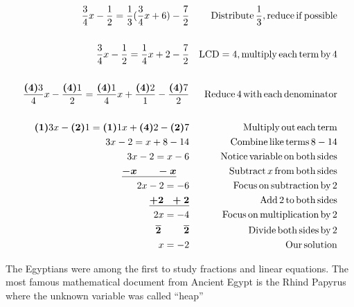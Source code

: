 \begin{example}\label{Lin33}
  \begin{eqnarray*}
    \frac{3}{4} x - \frac{1}{2} = \frac{1}{3} (\frac{3}{4} x + 6) -
    \frac{7}{2} &  & \operatorname{Distribute} \frac{1}{3}, \operatorname{reduce} \operatorname{if}
    \operatorname{possible}\\
    &  & \\
    \frac{3}{4} x - \frac{1}{2} = \frac{1}{4} x + 2 - \frac{7}{2} &  &
    \operatorname{LCD} = 4, \operatorname{multiply} \operatorname{each} \operatorname{term} \operatorname{by} 4\\
    &  & \\
    \frac{\boldsymbol{(4)} 3}{4} x - \frac{\boldsymbol{(4)} 1}{2} =
    \frac{\boldsymbol{(4)} 1}{4} x + \frac{\boldsymbol{(4)} 2}{1} -
    \frac{\boldsymbol{(4)} 7}{2} &  & \operatorname{Reduce} 4 \operatorname{with} \operatorname{each}
    \operatorname{denominator}\\
    &  & \\
    \boldsymbol{(1)} 3 x - \boldsymbol{(2)} 1 = \boldsymbol{(1)} 1 x +
    \boldsymbol{(4)} 2 - \boldsymbol{(2)} 7 &  & \operatorname{Multiply} \operatorname{out}
    \operatorname{each} \operatorname{term}\\
    3 x - 2 = x + 8 - 14 &  & \operatorname{Combine} \operatorname{like} \operatorname{terms} 8 - 14\\
		3 x - 2 = x - 6 &  & \operatorname{Notice} \operatorname{variable} \operatorname{on} \operatorname{both}
    \operatorname{sides}\\
    \boldsymbol{\underline{- x ~~~~~~- x}}~~~~  &  & \operatorname{Subtract} x \operatorname{from}
    \operatorname{both} \operatorname{sides}\\
    2 x - 2 = - 6 &  & \operatorname{Focus} \operatorname{on} \operatorname{subtraction} \operatorname{by} 2\\
    \boldsymbol{\underline{+ 2 ~~+ 2}} &  & \operatorname{Add} 2 \operatorname{to} \operatorname{both}
    \operatorname{sides}\\
    2 x = - 4 &  & \operatorname{Focus} \operatorname{on} \operatorname{multiplication} \operatorname{by} 2\\
    \boldsymbol{\overline{2} ~~~~~~~ \overline{2}} &  & \operatorname{Divide} \operatorname{both}
    \operatorname{sides} \operatorname{by} 2\\
    x = - 2 &  & \operatorname{Our} \operatorname{solution}
  \end{eqnarray*}
\end{example}

   {} The Egyptians were among the first to study
  fractions and linear equations. The most famous mathematical document from
  Ancient Egypt is the Rhind Papyrus where the unknown variable was called
  ``heap''